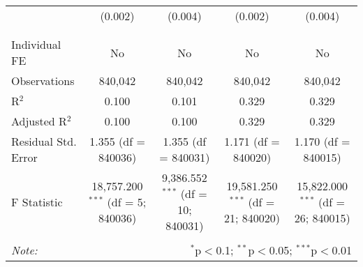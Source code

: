 \documentclass[
]{article}
\begin{document}
\begin{table}[!htbp]
{\begin{tabular}{@{\extracolsep{5pt}}lcccc}
  & (0.002) & (0.004) & (0.002) & (0.004) \\ 
  & & & & \\ 
\hline \\[-1.8ex] 
Individual FE & No & No & No & No \\ 
Observations & 840,042 & 840,042 & 840,042 & 840,042 \\ 
R$^{2}$ & 0.100 & 0.101 & 0.329 & 0.329 \\ 
Adjusted R$^{2}$ & 0.100 & 0.100 & 0.329 & 0.329 \\ 
Residual Std. Error & 1.355 (df = 840036) & 1.355 (df = 840031) & 1.171 (df = 840020) & 1.170 (df = 840015) \\ 
F Statistic & 18,757.200$^{***}$ (df = 5; 840036) & 9,386.552$^{***}$ (df = 10; 840031) & 19,581.250$^{***}$ (df = 21; 840020) & 15,822.000$^{***}$ (df = 26; 840015) \\ 
\hline 
\hline \\[-1.8ex] 
\textit{Note:}  & \multicolumn{4}{r}{$^{*}$p$<$0.1; $^{**}$p$<$0.05; $^{***}$p$<$0.01} \\ 
\end{tabular}
} 
\end{table} 
\newpage
\end{document}

